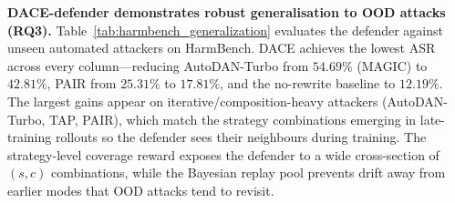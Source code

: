 \documentclass{article}
\newcommand{\method}{\textsc{DACE}\xspace}
\begin{document}
\textbf{\method-defender demonstrates robust generalisation to OOD attacks (RQ3).} Table~\ref{tab:harmbench_generalization} evaluates the defender against unseen automated attackers on HarmBench. \method achieves the lowest ASR across every column---reducing AutoDAN-Turbo from $54.69\%$ (MAGIC) to $42.81\%$, PAIR from $25.31\%$ to $17.81\%$, and the no-rewrite baseline to $12.19\%$. The largest gains appear on iterative/composition-heavy attackers (AutoDAN-Turbo, TAP, PAIR), which match the strategy combinations emerging in late-training rollouts so the defender sees their neighbours during training. The strategy-level coverage reward exposes the defender to a wide cross-section of $(s,c)$ combinations, while the Bayesian replay pool prevents drift away from earlier modes that OOD attacks tend to revisit.



\end{document}
